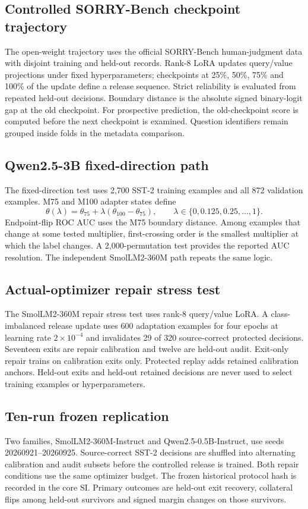 \documentclass[11pt,letterpaper]{article}
\theoremstyle{plain}
\newcommand{\1}{\mathbf 1}
\begin{document}
\subsection{Controlled SORRY-Bench checkpoint trajectory}
The open-weight trajectory uses the official SORRY-Bench human-judgment data with disjoint training and held-out records. Rank-8 LoRA updates query/value projections under fixed hyperparameters; checkpoints at 25\%, 50\%, 75\% and 100\% of the update define a release sequence. Strict reliability is evaluated from repeated held-out decisions. Boundary distance is the absolute signed binary-logit gap at the old checkpoint. For prospective prediction, the old-checkpoint score is computed before the next checkpoint is examined. Question identifiers remain grouped inside folds in the metadata comparison.

\subsection{Qwen2.5-3B fixed-direction path}
The fixed-direction test uses 2,700 SST-2 training examples and all 872 validation examples. M75 and M100 adapter states define
\begin{equation}
 \theta(\lambda)=\theta_{75}+\lambda(\theta_{100}-\theta_{75}),
 \qquad \lambda\in\{0,0.125,0.25,\ldots,1\}.
\label{eq:s_fixed_direction_path}
\end{equation}
Endpoint-flip ROC AUC uses the M75 boundary distance. Among examples that change at some tested multiplier, first-crossing order is the smallest multiplier at which the label changes. A 2,000-permutation test provides the reported AUC resolution. The independent SmolLM2-360M path repeats the same logic.

\subsection{Actual-optimizer repair stress test}
The SmolLM2-360M repair stress test uses rank-8 query/value LoRA. A class-imbalanced release update uses 600 adaptation examples for four epochs at learning rate $2\times10^{-4}$ and invalidates 29 of 320 source-correct protected decisions. Seventeen exits are repair calibration and twelve are held-out audit. Exit-only repair trains on calibration exits only. Protected replay adds retained calibration anchors. Held-out exits and held-out retained decisions are never used to select training examples or hyperparameters.

\subsection{Ten-run frozen replication}
Two families, SmolLM2-360M-Instruct and Qwen2.5-0.5B-Instruct, use seeds 20260921--20260925. Source-correct SST-2 decisions are shuffled into alternating calibration and audit subsets before the controlled release is trained. Both repair conditions use the same optimizer budget. The frozen historical protocol hash is recorded in the core SI. Primary outcomes are held-out exit recovery, collateral flips among held-out survivors and signed margin changes on those survivors.
\end{document}
